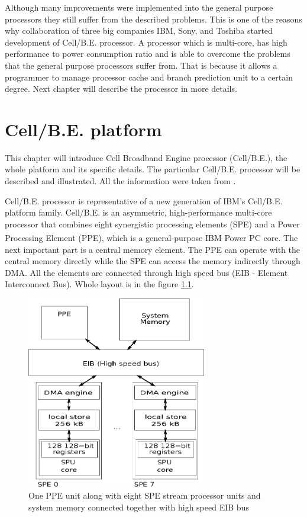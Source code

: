\par
Although many improvements were implemented into the general purpose processors they still suffer from the described problems.
This is one of the reasons why collaboration of three big companies IBM, Sony, and Toshiba started development of \mbox{Cell/B.E.} processor.
A processor which is multi-core, has high performance to power consumption ratio and is able to overcome the problems that the general purpose processors suffer from.
That is because it allows a programmer to manage processor cache and branch prediction unit to a certain degree.
Next chapter will describe the processor in more details.

\chapter{\mbox{Cell/B.E.} platform}

This chapter will introduce Cell Broadband Engine processor (\mbox{Cell/B.E.}), the whole platform and its specific details.
The particular \mbox{Cell/B.E.} processor will be described and illustrated.
All the information were taken from \cite{cbeCenter}.

\par
\mbox{Cell/B.E.} processor is representative of a new generation of IBM's \mbox{Cell/B.E.} platform family.
\mbox{Cell/B.E.} is an asymmetric, high-performance multi-core processor that combines eight synergistic processing elements (SPE) and a Power Processing Element (PPE), which is a general-purpose IBM Power PC\textsuperscript{\textregistered} core.
The next important part is a central memory element.
The PPE can operate with the central memory directly while the SPE can access the memory indirectly through DMA.
All the elements are connected through high speed bus (EIB - Element Interconnect Bus).
Whole layout is in the figure \ref{fg:processorLayout}.

\begin{figure}
    \centering
    \includegraphics[width=0.7\textwidth]{data/cellLayout}
    \caption[\mbox{Cell/B.E.} processor layout]{One PPE unit along with eight SPE stream processor units and system memory connected together with high speed EIB bus}
    \label{fg:processorLayout}
\end{figure}

